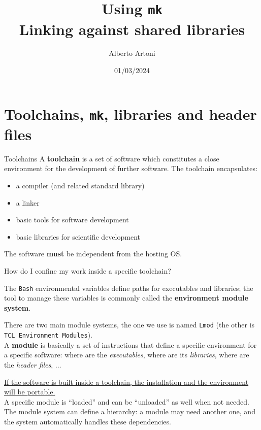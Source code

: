 \documentclass[10pt,aspectratio=169]{beamer}
\begin{document}
\title{Using \texttt{mk}\\
  Linking against shared libraries}
\author{Alberto Artoni}
\date{01/03/2024}

\begin{frame}
  \maketitle
\end{frame}

\section{Toolchains, \texttt{mk}, libraries and header files}

\begin{frame}{Toolchains}
    A \textbf{toolchain} is a set of software which constitutes a close environment for the development of further software.
    The toolchain encapsulates:
  \begin{itemize}
      \item a compiler (and related standard library)
  \item a linker
  \item basic tools for software development
  \item basic libraries for scientific development
  \end{itemize}	

    The software \textbf{must} be independent from the hosting OS.

\end{frame}

\begin{frame}{How do I confine my work inside a specific toolchain?}

    The \texttt{Bash} environmental variables define paths for executables and libraries; the tool to manage these variables is commonly called the \textbf{environment module system}.

  There are two main module systems, the one we use is named \texttt{Lmod} (the other is \texttt{TCL Environment Modules}).\\[3mm]

    A \textbf{module} is basically a set of instructions that define a specific environment for a specific software: where are the \textit{executables}, where are its \textit{libraries}, where are the \textit{header files}, $\dots$

    \underline{If the software is built inside a toolchain, the installation and the environment  will be portable.} \\[3mm]

A specific module is “loaded” and can be “unloaded” as well when not needed.
The module system can define a hierarchy: a module may need another one, and the system automatically handles these dependencies.

\end{frame}
\end{document}

